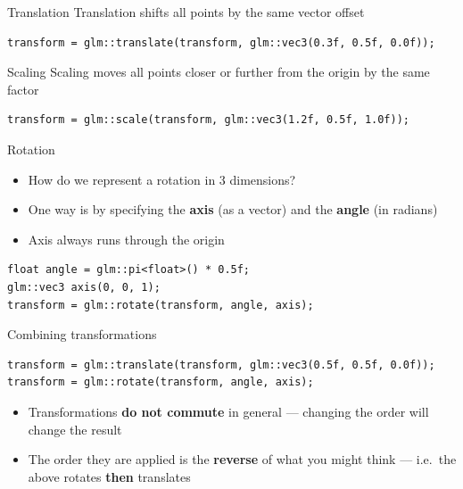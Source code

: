 \begin{frame}[fragile]{Translation}
	\pause Translation shifts all points by the same vector offset
	\pause \begin{lstlisting}
transform = glm::translate(transform, glm::vec3(0.3f, 0.5f, 0.0f));
	\end{lstlisting}
\end{frame}

\begin{frame}[fragile]{Scaling}
	\pause Scaling moves all points closer or further from the origin by the same factor
	\pause \begin{lstlisting}
transform = glm::scale(transform, glm::vec3(1.2f, 0.5f, 1.0f));
	\end{lstlisting}
\end{frame}

\begin{frame}[fragile]{Rotation}
	\begin{itemize}
		\pause\item How do we represent a rotation in 3 dimensions?
		\pause\item One way is by specifying the \textbf{axis} (as a vector) and the \textbf{angle} (in radians)
		\pause\item Axis always runs through the origin
	\end{itemize}
	\pause \begin{lstlisting}
float angle = glm::pi<float>() * 0.5f;
glm::vec3 axis(0, 0, 1);
transform = glm::rotate(transform, angle, axis);
	\end{lstlisting}
\end{frame}

\begin{frame}[fragile]{Combining transformations}
	\pause \begin{lstlisting}
transform = glm::translate(transform, glm::vec3(0.5f, 0.5f, 0.0f));
transform = glm::rotate(transform, angle, axis);
	\end{lstlisting}
	\begin{itemize}
		\pause\item Transformations \textbf{do not commute} in general ---
			changing the order will change the result
		\pause\item The order they are applied is the \textbf{reverse} of what you might think ---
			i.e.\ the above rotates \textbf{then} translates
	\end{itemize}
\end{frame}

